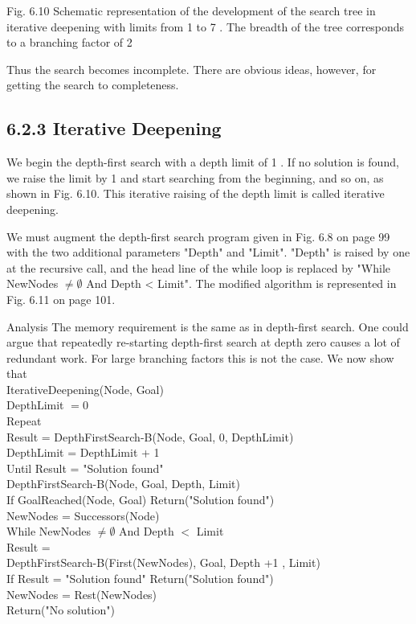 \documentclass[10pt]{article}
\begin{document}
Fig. 6.10 Schematic representation of the development of the search tree in iterative deepening with limits from 1 to 7 . The breadth of the tree corresponds to a branching factor of 2

Thus the search becomes incomplete. There are obvious ideas, however, for getting the search to completeness.

\subsection*{6.2.3 Iterative Deepening}
We begin the depth-first search with a depth limit of 1 . If no solution is found, we raise the limit by 1 and start searching from the beginning, and so on, as shown in Fig. 6.10. This iterative raising of the depth limit is called iterative deepening.

We must augment the depth-first search program given in Fig. 6.8 on page 99 with the two additional parameters "Depth" and "Limit". "Depth" is raised by one at the recursive call, and the head line of the while loop is replaced by "While NewNodes $\neq \emptyset$ And Depth < Limit". The modified algorithm is represented in Fig. 6.11 on page 101.

Analysis The memory requirement is the same as in depth-first search. One could argue that repeatedly re-starting depth-first search at depth zero causes a lot of redundant work. For large branching factors this is not the case. We now show that\\
IterativeDeepening(Node, Goal)\\
DepthLimit $=0$\\
Repeat\\
Result = DepthFirstSearch-B(Node, Goal, 0, DepthLimit)\\
DepthLimit = DepthLimit + 1\\
Until Result = "Solution found"\\
DepthFirstSearch-B(Node, Goal, Depth, Limit)\\
If GoalReached(Node, Goal) Return("Solution found")\\
NewNodes = Successors(Node)\\
While NewNodes $\neq \emptyset$ And Depth $<$ Limit\\
Result =\\
DepthFirstSearch-B(First(NewNodes), Goal, Depth +1 , Limit)\\
If Result = "Solution found" Return("Solution found")\\
NewNodes = Rest(NewNodes)\\
Return("No solution")
\end{document}
